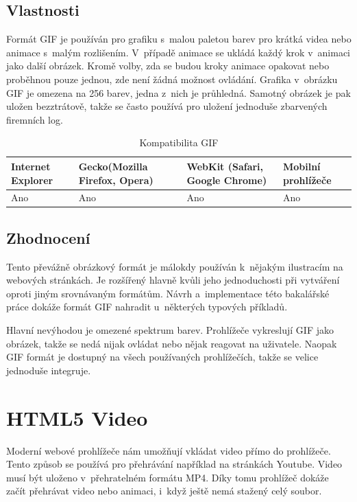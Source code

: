 \subsection*{Vlastnosti}

Formát GIF\cite{gif} je používán pro grafiku s~malou paletou barev pro krátká videa nebo animace s~malým rozlišením. V~případě animace se ukládá každý krok v~animaci jako další obrázek. Kromě volby, zda se budou kroky animace opakovat nebo proběhnou pouze jednou, zde není žádná možnost ovládání. Grafika v~obrázku GIF je omezena na 256 barev, jedna z~nich je průhledná. Samotný obrázek je pak uložen bezztrátově, takže se často používá pro uložení jednoduše zbarvených firemních log.

\begin{table}[h]\centering\footnotesize
	\caption[Kompatibilita GIF]{Kompatibilita GIF}\label{tab:research-gif}
	\begin{tabular}{|m{2.5cm}|m{2.5cm}|m{2.5cm}|m{2.5cm}|}\hline
		Internet Explorer & Gecko(Mozilla Firefox, Opera)	& WebKit (Safari, Google Chrome) &  Mobilní prohlížeče
		\tabularnewline \hline \hline 
		Ano  &  Ano & Ano & Ano
		\tabularnewline \hline
	\end{tabular}
\end{table}

\subsection*{Zhodnocení}

Tento převážně obrázkový formát je málokdy používán k~nějakým ilustracím na webových stránkách. Je rozšířený hlavně kvůli jeho jednoduchosti při vytváření oproti jiným srovnávaným formátům. Návrh a~implementace této bakalářské práce dokáže formát GIF nahradit u~některých typových příkladů. 

Hlavní nevýhodou je omezené spektrum barev. Prohlížeče vykreslují GIF jako obrázek, takže se nedá nijak ovládat nebo nějak reagovat na uživatele. Naopak GIF formát je dostupný na všech používaných prohlížečích, takže se velice jednoduše integruje.


\section{HTML5 Video}

Moderní webové prohlížeče nám umožňují vkládat video přímo do prohlížeče. Tento způsob se používá pro přehrávání například na stránkách Youtube\cite{youtubeHtml5}. 
Video musí být uloženo v~přehratelném formátu MP4\cite{mp4}. Díky tomu prohlížeč dokáže začít přehrávat video nebo animaci, i~když ještě nemá stažený celý soubor.


